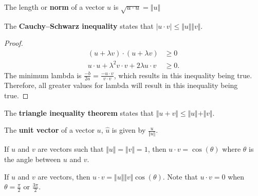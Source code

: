 \begin{definition}
	The length or \textbf{norm} of a vector \( u \) is \( \sqrt{u\cdot u} = \Vert u \Vert \)
\end{definition}

\begin{theorem}
	The \textbf{Cauchy–Schwarz inequality} states that \( |u \cdot  v| \le \Vert u \Vert \Vert v\Vert  \).
\end{theorem}
\begin{proof}
	\begin{align*}
		(u + \lambda v) \cdot (u + \lambda v) &\ge 0 \\
		u \cdot u + \lambda^2 v \cdot v + 2\lambda u \cdot v &\ge 0
	.\end{align*}
	The minimum lambda is \( \frac{-b}{2a} = \frac{-u \cdot v}{v\cdot v}\), which results in this inequality being true. Therefore, all greater values for lambda will result in this inequality being true.
\end{proof}

\begin{theorem}
	The \textbf{triangle inequality theorem} states that \( \Vert u + v \Vert \le  \Vert u \Vert + \Vert v \Vert \).
\end{theorem}

\begin{definition}
	The \textbf{unit vector} of a vector \( u \), \( \hat{u} \) is given by \( \frac{u}{\Vert u \Vert} \).
\end{definition}

\begin{theorem}
	If \( u \) and \( v \) are vectors such that \( \Vert u \Vert = \Vert v \Vert = 1 \), then \( u\cdot v = \cos(\theta) \) where \( \theta \) is the angle between \( u \) and \( v \).
\end{theorem}

\begin{corollary}
	If \( u \) and \( v \) are vectors, then \( u\cdot v = \Vert u \Vert \Vert v \Vert \cos (\theta)\). Note that \( u\cdot v =0\) when \( \theta =\frac{\pi}{2} \) or \( \frac{3\pi}{2}  \).
\end{corollary}

